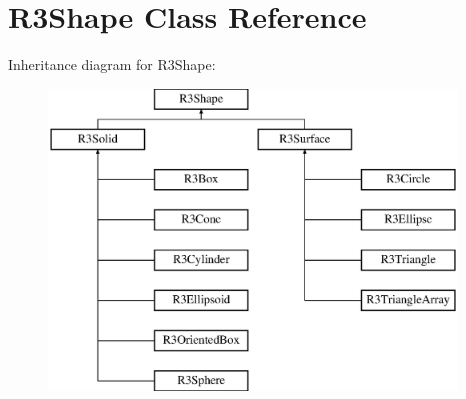 \hypertarget{class_r3_shape}{}\section{R3\+Shape Class Reference}
\label{class_r3_shape}
Inheritance diagram for R3\+Shape\+:\begin{figure}[H]
\begin{center}
\leavevmode
\includegraphics[height=8.000000cm]{class_r3_shape}
\end{center}
\end{figure}
